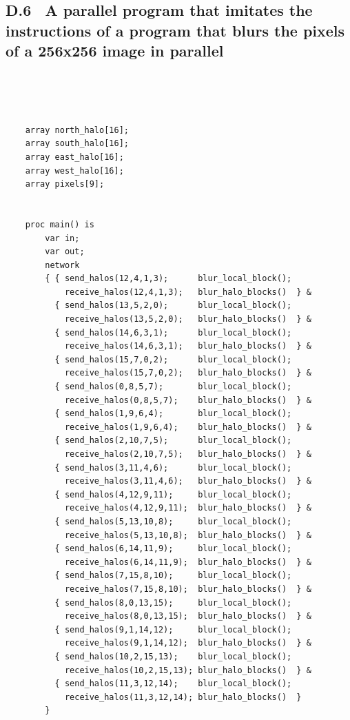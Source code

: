 \documentclass[a4paper, 12pt]{article}
\begin{document}
\newpage
\subsection*{D.6 \ A parallel program that imitates the instructions of a program that blurs the pixels of a 256x256 image in parallel}
\ 
\begin{lstlisting}

    
    array north_halo[16];
    array south_halo[16];
    array east_halo[16];
    array west_halo[16];
    array pixels[9];


    proc main() is
        var in;
        var out;
        network 
        { { send_halos(12,4,1,3);      blur_local_block(); 
            receive_halos(12,4,1,3);   blur_halo_blocks()  } &
          { send_halos(13,5,2,0);      blur_local_block(); 
            receive_halos(13,5,2,0);   blur_halo_blocks()  } &
          { send_halos(14,6,3,1);      blur_local_block(); 
            receive_halos(14,6,3,1);   blur_halo_blocks()  } &
          { send_halos(15,7,0,2);      blur_local_block(); 
            receive_halos(15,7,0,2);   blur_halo_blocks()  } &
          { send_halos(0,8,5,7);       blur_local_block(); 
            receive_halos(0,8,5,7);    blur_halo_blocks()  } &
          { send_halos(1,9,6,4);       blur_local_block(); 
            receive_halos(1,9,6,4);    blur_halo_blocks()  } &
          { send_halos(2,10,7,5);      blur_local_block(); 
            receive_halos(2,10,7,5);   blur_halo_blocks()  } &
          { send_halos(3,11,4,6);      blur_local_block(); 
            receive_halos(3,11,4,6);   blur_halo_blocks()  } &
          { send_halos(4,12,9,11);     blur_local_block(); 
            receive_halos(4,12,9,11);  blur_halo_blocks()  } &
          { send_halos(5,13,10,8);     blur_local_block(); 
            receive_halos(5,13,10,8);  blur_halo_blocks()  } &
          { send_halos(6,14,11,9);     blur_local_block(); 
            receive_halos(6,14,11,9);  blur_halo_blocks()  } &
          { send_halos(7,15,8,10);     blur_local_block(); 
            receive_halos(7,15,8,10);  blur_halo_blocks()  } &
          { send_halos(8,0,13,15);     blur_local_block(); 
            receive_halos(8,0,13,15);  blur_halo_blocks()  } &
          { send_halos(9,1,14,12);     blur_local_block(); 
            receive_halos(9,1,14,12);  blur_halo_blocks()  } &
          { send_halos(10,2,15,13);    blur_local_block(); 
            receive_halos(10,2,15,13); blur_halo_blocks()  } &
          { send_halos(11,3,12,14);    blur_local_block(); 
            receive_halos(11,3,12,14); blur_halo_blocks()  } 
        }


\end{lstlisting}
\end{document}
